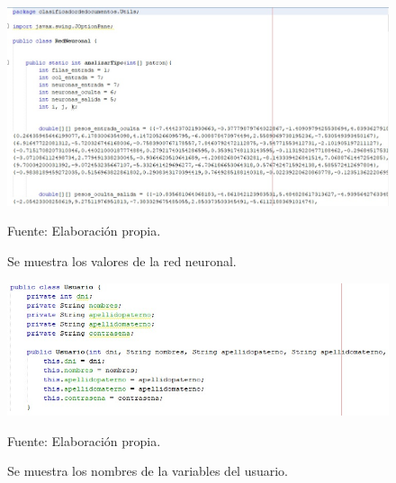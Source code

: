 \begin{figure}[h!]
	\centering
		\includegraphics[scale=0.5]{imagenes/ValoresRedYPesos.jpeg}
		\caption{Se muestra los valores de la red neuronal.}
		\begin{center}
    Fuente: Elaboración propia.
    \end{center}
	\label{fig:ValoresRedNeuronal}
\end{figure}

\begin{figure}[h!]
	\centering
		\includegraphics[scale=0.5]{imagenes/Usuario.jpg}
		\caption{Se muestra los nombres de la variables del usuario.}
		\begin{center}
    Fuente: Elaboración propia.
    \end{center}
	\label{fig:Usuario}
\end{figure}
\newpage


\newpage




%
%



